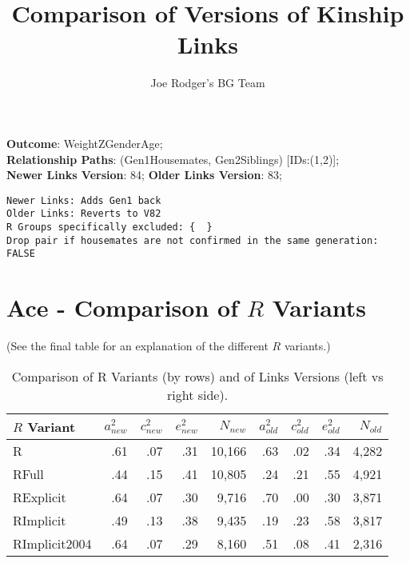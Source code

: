 \documentclass{article}\usepackage[]{graphicx}\usepackage[]{color}
\title{Comparison of Versions of Kinship Links}
\author{Joe Rodger's BG Team}
\makeatletter
\newenvironment{kframe}{%
 \def\at@end@of@kframe{}%
 \ifinner\ifhmode%
  \def\at@end@of@kframe{\end{minipage}}%
  \begin{minipage}{\columnwidth}%
 \fi\fi%
 \def\FrameCommand##1{\hskip\@totalleftmargin \hskip-\fboxsep
 \colorbox{shadecolor}{##1}\hskip-\fboxsep
     \hskip-\linewidth \hskip-\@totalleftmargin \hskip\columnwidth}%
 \MakeFramed {\advance\hsize-\width
   \@totalleftmargin\z@ \linewidth\hsize
   \@setminipage}}%
 {\par\unskip\endMakeFramed%
 \at@end@of@kframe}
\newenvironment{knitrout}{}{} %
\makeatother
\begin{document}
\maketitle
\setcounter{totalnumber}{8} %

\setlength{\parindent}{0pt}%











\textbf{Outcome}: WeightZGenderAge;\\
\textbf{Relationship Paths}: (Gen1Housemates, Gen2Siblings) [IDs:(1,2)];\\
\textbf{Newer Links Version}: 84;
\textbf{Older Links Version}: 83;

\begin{knitrout}
\color{fgcolor}\begin{kframe}
\begin{verbatim}
Newer Links: Adds Gen1 back
Older Links: Reverts to V82
R Groups specifically excluded: {  }
Drop pair if housemates are not confirmed in the same generation: FALSE
\end{verbatim}
\end{kframe}
\end{knitrout}





\section{Ace - Comparison of $R$ Variants} 
(See the final table for an explanation of the different $R$ variants.)
\begin{table}[ht]
\centering
{\large
\begin{tabular}{l|rrrr|rrrr}
  \hline
$R$ Variant & $a_{new}^2$ & $c_{new}^2$ & $e_{new}^2$ & $N_{new}$ & $a_{old}^2$ & $c_{old}^2$ & $e_{old}^2$ & $N_{old}$ \\ 
  \hline
R & .61 & .07 & .31 & 10,166 & .63 & .02 & .34 & 4,282 \\ 
  RFull & .44 & .15 & .41 & 10,805 & .24 & .21 & .55 & 4,921 \\ 
  RExplicit & .64 & .07 & .30 & 9,716 & .70 & .00 & .30 & 3,871 \\ 
  RImplicit & .49 & .13 & .38 & 9,435 & .19 & .23 & .58 & 3,817 \\ 
  RImplicit2004 & .64 & .07 & .29 & 8,160 & .51 & .08 & .41 & 2,316 \\ 
   \hline
\end{tabular}
}
\caption{Comparison of R Variants (by rows) and of Links Versions (left vs right side).} 
\end{table}
\end{document}
